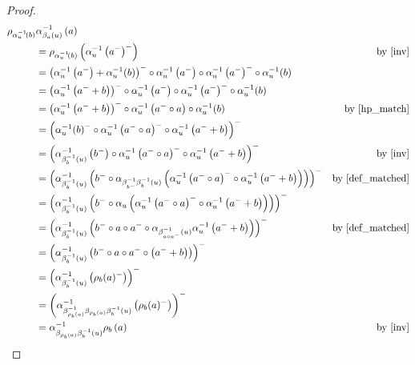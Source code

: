 \documentclass[preprint,1p]{elsarticle}
\theoremstyle{definition}               %
\begin{document}
\begin{proof}
\begin{align*}
    \rho_{\alpha^{-1}_u\!\left(b\right)}&\alpha^{-1}_{\beta_a\left(u\right)}\left(a\right) \\&=\rho_{\alpha^{-1}_u\!\left(b\right)}\left(\alpha_u^{-1}\left(a^-\right)^-\right)&\mbox{by \eqref{inv}}\\
    &=\left(\alpha_u^{-1}\left(a^-\right)+ \alpha^{-1}_u\!\left(b\right)\right)^- \circ \alpha_u^{-1}\left(a^-\right) \circ \alpha_u^{-1}\left(a^-\right)^- \circ \alpha^{-1}_u\!\left(b\right)\\
    &=\left(\alpha_u^{-1}\left(a^-+b\right)\right)^- \circ \alpha_u^{-1}\left(a^-\right) \circ \alpha_u^{-1}\left(a^-\right)^- \circ \alpha^{-1}_u\!\left(b\right)\\
    &=\left(\alpha_u^{-1}\left(a^-+b\right)\right)^- \circ \alpha_u^{-1}\left(a^- \circ a \right) \circ \alpha^{-1}_u\!\left(b\right) &\mbox{by \eqref{hp_match}}\\
    &=\left(\alpha^{-1}_u\!\left(b\right)^- \circ \alpha_u^{-1}\left(a^- \circ a \right)^- \circ  \alpha_u^{-1}\left(a^-+b\right)\right)^-\\
    &=\left(\alpha^{-1}_{\beta^{-1}_b\left(u\right)}\left(b^-\right) \circ \alpha_u^{-1}\left(a^- \circ a \right)^- \circ  \alpha_u^{-1}\left(a^-+b\right)\right)^-&\mbox{by \eqref{inv}}\\
     &=\left(\alpha^{-1}_{\beta^{-1}_b\left(u\right)}\left(b^- \circ \alpha_{\beta^{-1}_{b^-}\beta^{-1}_b(u)}\left(\alpha_u^{-1}\left(a^- \circ a \right)^- \circ  \alpha_u^{-1}\left(a^-+b\right)\right)\right)\right)^- &\mbox{by \cref{def_matched}}\\
     &=\left(\alpha^{-1}_{\beta^{-1}_b\left(u\right)}\left(b^- \circ \alpha_{u}\left(\alpha_u^{-1}\left(a^- \circ a \right)^- \circ  \alpha_u^{-1}\left(a^-+b\right)\right)\right)\right)^- \\
     &=\left(\alpha^{-1}_{\beta^{-1}_b\left(u\right)}\left(b^- \circ a  \circ a^- \circ \alpha_{\beta^{-1}_{a  \circ a^-}\left(u\right)}\alpha_u^{-1}\left(a^-+b\right)\right)\right)^- &\mbox{by \cref{def_matched}}\\
     &=\left(\alpha^{-1}_{\beta^{-1}_b\left(u\right)}\left(b^- \circ a  \circ a^- \circ \left(a^-+b\right)\right)\right)^-\\
&=\left(\alpha^{-1}_{\beta^{-1}_b\left(u\right)}\left(\rho_b(a)^-\right)\right)^-\\
    &=\left(\alpha^{-1}_{\beta_{\rho_b\left(a\right)}^{-1}\beta_{\rho_b\left(a\right)}\beta^{-1}_b\left(u\right)}\left(\rho_b(a)^-\right)\right)^- \\
    &=\alpha^{-1}_{\beta_{\rho_b\left(a\right)}\beta^{-1}_b\left(u\right)}\rho_b\left(a\right) &\mbox{by \eqref{inv}}

\end{align*}
\end{proof}
\end{document}
